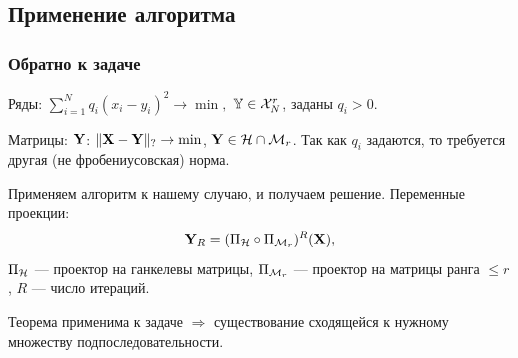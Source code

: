 \documentclass[unicode, notheorems]{beamer}
\begin{document}
%	
%	
%	
%	
%	
%	
%	

\subsection{Применение алгоритма}
\begin{frame}
	\frametitle{Обратно к задаче}
	Ряды: $\sum \limits_{i=1}^N q_i(x_i - y_i)^2 \to \min,$ $\mathbb{Y} \in \mathcal{X}_N^r$, заданы $q_i > 0$.
	
	Матрицы: $\mathbf{Y}$: $\|\mathbf{X} - \mathbf{Y}\|_? \to \min$, $\mathbf{Y} \in \mathcal{H} \cap \mathcal{M}_r$. Так как $q_i$ задаются, то требуется другая (не фробениусовская)  норма.
	
	\vspace{0.3cm}
	Применяем алгоритм к нашему случаю, и получаем решение. Переменные проекции: 
	\begin{equation*}
	\mathbf{Y}_R = (\Pi_{\mathcal{H}} \circ \Pi_{\mathcal{M}_r})^R (\mathbf{X}),
	\end{equation*}
	$\Pi_{\mathcal{H}}$ --- проектор на ганкелевы матрицы, $\Pi_{\mathcal{M}_r}$ --- проектор на матрицы ранга $\le r$, $R$ --- число итераций.
	
	Теорема применима к задаче $\Rightarrow$ существование сходящейся к нужному множеству подпоследовательности.
\end{frame}
\end{document}

